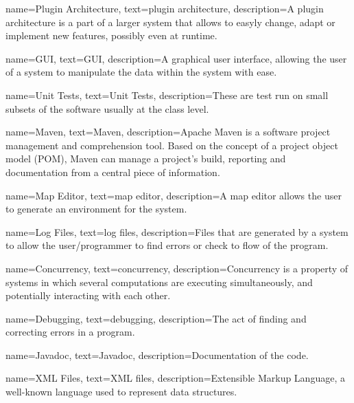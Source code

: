 {
    name={Plugin Architecture},
    text={plugin architecture},
    description={A plugin architecture is a part of a larger system that allows to easyly change, adapt or implement new features, possibly even at runtime.}
}

{
    name={GUI},
    text={GUI},
    description={A graphical user interface, allowing the user of a system to manipulate the data within the system with ease.}
}

{
    name={Unit Tests},
    text={Unit Tests},
    description={These are test run on small subsets of the software usually at the class level.}
}

{
    name={Maven},
    text={Maven},
    description={Apache Maven is a software project management and comprehension tool. Based on the concept of a project object model (POM), Maven can manage a project's build, reporting and documentation from a central piece of information.}
}

{
    name={Map Editor},
    text={map editor},
    description={A map editor allows the user to generate an environment for the system.}
}

{
    name={Log Files},
    text={log files},
    description={Files that are generated by a system to allow the user/programmer to find errors or check to flow of the program.}
}

{
    name={Concurrency},
    text={concurrency},
    description={Concurrency is a property of systems in which several computations are executing simultaneously, and potentially interacting with each other.}
}

{
    name={Debugging},
    text={debugging},
    description={The act of finding and correcting errors in a program.}
}

{
    name={Javadoc},
    text={Javadoc},
    description={Documentation of the code.}
}

{
    name={XML Files},
    text={XML files},
    description={Extensible Markup Language, a well-known language used to represent data structures.}
}